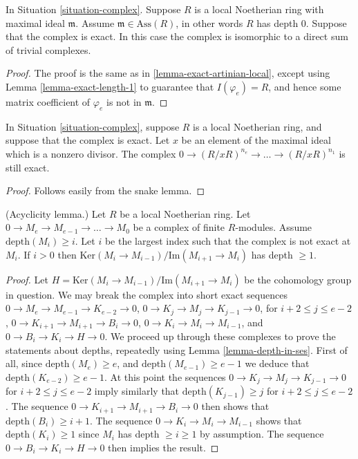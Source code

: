 \begin{lemma}
\label{lemma-exact-depth-zero-local}
In Situation \ref{situation-complex}. Suppose $R$ is
a local Noetherian ring with maximal ideal $\mathfrak m$.
Assume $\mathfrak m \in \text{Ass}(R)$, in other words
$R$ has depth $0$. Suppose that the complex is exact.
In this case the complex is isomorphic to a direct sum of trivial
complexes.
\end{lemma}

\begin{proof}
The proof is the same as in \ref{lemma-exact-artinian-local},
except using Lemma \ref{lemma-exact-length-1} to guarantee
that $I(\varphi_e) = R$, and hence some matrix coefficient
of $\varphi_e$ is not in $\mathfrak m$.
\end{proof}

\begin{lemma}
\label{lemma-div-x-exact-one-less}
In Situation \ref{situation-complex}, suppose $R$ is
a local Noetherian ring, and suppose that the complex
is exact. Let $x$ be an element of the maximal ideal
which is a nonzero divisor. The complex
$0 \to (R/xR)^{n_e} \to \ldots \to (R/xR)^{n_1}$
is still exact.
\end{lemma}

\begin{proof}
Follows easily from the snake lemma.
\end{proof}

\begin{lemma}
\label{lemma-acyclic}
(Acyclicity lemma.)
Let $R$ be a local Noetherian ring.
Let $0 \to M_e \to M_{e-1} \to \ldots \to M_0$
be a complex of finite $R$-modules.
Assume $\text{depth}(M_i) \geq i$.
Let $i$ be the largest index such that the complex is
not exact at $M_i$. If $i > 0$ then
$\text{Ker}(M_i \to M_{i-1})/\text{Im}(M_{i + 1} \to M_i)$
has depth $\geq 1$.
\end{lemma}

\begin{proof}
Let $H = \text{Ker}(M_i \to M_{i-1})/\text{Im}(M_{i + 1} \to M_i)$ be the
cohomology group in question.
We may break the complex into short exact sequences
$0 \to M_e \to M_{e-1} \to K_{e-2} \to 0$,
$0 \to K_j \to M_j \to K_{j-1} \to 0$, for $i + 2 \leq j \leq e-2 $,
$0 \to K_{i + 1} \to M_{i + 1} \to B_i \to 0$,
$0 \to K_i \to M_i \to M_{i-1}$, and
$0 \to B_i \to K_i \to H \to 0$.
We proceed up through these complexes to
prove the statements about depths, repeatedly using
Lemma \ref{lemma-depth-in-ses}.
First of all, since $\text{depth}(M_e) \geq e$,
and $\text{depth}(M_{e-1}) \geq e-1$ we deduce
that $\text{depth}(K_{e-2}) \geq e - 1$. At this point the
sequences $0 \to K_j \to M_j \to K_{j-1} \to 0$ for $i + 2 \leq j \leq e-2 $
imply similarly that $\text{depth}(K_{j-1}) \geq j$ for
$i + 2 \leq j \leq e-2$. The sequence
$0 \to K_{i + 1} \to M_{i + 1} \to B_i \to 0$
then shows that $\text{depth}(B_i) \geq i + 1$. The sequence
$0 \to K_i \to M_i \to M_{i-1}$ shows that $\text{depth}(K_i) \geq 1$
since $M_i$ has depth $\geq i \geq 1$ by assumption.
The sequence $0 \to B_i \to K_i \to H \to 0$ then
implies the result.
\end{proof}

